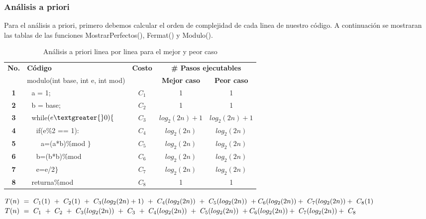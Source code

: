\documentclass[12pt,twoside]{article}
\begin{document}
\subsubsection{An\'alisis a priori}
Para el análisis a priori, primero debemos calcular el orden de complejidad de cada linea de nuestro código. A continuación se mostraran las tablas de las funciones MostrarPerfectos(), Fermat() y Modulo().
\begin{longtable}{||c|l|c|c|c||}
    \caption{An\'alisis a priori linea por linea para el mejor y peor caso}\\
    \hline
        \multirow{2}{*}{\textbf{No.}} & \textbf{C\'odigo} & \multirow{2}{*}{\textbf{Costo}} & \multicolumn{2}{|c||}{\textbf{\# Pasos ejecutables}}\\
    \cline{2-2}\cline{4-5}
         & {modulo(int base, int e, int   mod)} & & \textbf{Mejor caso} & \textbf{Peor caso}\\
    \hline
    \textbf{1}&{\,\,\,\,a = 1;}&{$C_{1}$}&{1}&{1}\\
    \hline
    \textbf{2}&{\,\,\,\,b = base;}&{$C_{2}$}&{1}&{1}\\
    \hline
    \textbf{3}&{\,\,\,\,while$(e\textgreater{}0)\{$}&{$C_{3}$}&{$log_2(2n)+1$}&{$log_2(2n)+1$}\\
    \hline
    \textbf{4}&{\,\,\,\,\,\,\,\,if(e\%2 == 1):}&{$C_{4}$}&{$log_2(2n)$}&{$log_2(2n)$}\\
    \hline
    \textbf{5}&{\,\,\,\,\,\,\,\,\,\,\,\,a=(a*b)\%mod $\}$}&{$C_{5}$}&{$log_2(2n)$}&{$log_2(2n)$}\\
    \hline
    \textbf{6}&{\,\,\,\,\,\,\,\,b=(b*b)\%mod}&{$C_{6}$}&{$log_2(2n)$}&{$log_2(2n)$}\\
    \hline
    \textbf{7}&{\,\,\,\,\,\,\,\,e=e/2$\}$}&{$C_{7}$}&{$log_2(2n)$}&{$log_2(2n)$}\\
    \hline
    \textbf{8}&{\,\,\,\,return\:a\%mod}&{$C_{8}$}&{1}&{1}\\
    \hline
\end{longtable}

$T(n)~=~C_{1}(1)~+~C_{2}(1)~+~C_{3}(log_2(2n)+1)~+~C_{4}(log_2(2n))~+~C_{5}(log_2(2n))~+~\\C_{6}(log_2(2n))+~C_{7}(log_2(2n))+~C_{8}(1)$\\

$T(n)~=~C_{1}~+~C_{2}~+~C_{3}(log_2(2n))~+~C_{3}~+~C_{4}(log_2(2n))~+~C_{5}(log_2(2n))~+~\\C_{6}(log_2(2n))+~C_{7}(log_2(2n))+~C_{8}$\\
\end{document}
